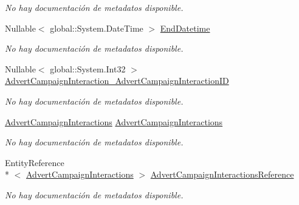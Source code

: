 \begin{DoxyCompactItemize}
\begin{DoxyCompactList}\small\item\em No hay documentación de metadatos disponible. \end{DoxyCompactList}\item 
Nullable$<$ global\-::\-System.\-Date\-Time $>$ \hyperlink{class_game_memory_1_1_advert_campaign_detail_interactions_a9903b1858d25ea52b6a58652e38af39c}{End\-Datetime}
\begin{DoxyCompactList}\small\item\em No hay documentación de metadatos disponible. \end{DoxyCompactList}\item 
Nullable$<$ global\-::\-System.\-Int32 $>$ \hyperlink{class_game_memory_1_1_advert_campaign_detail_interactions_a8eb103b878dc9bd2039eafba9299e467}{Advert\-Campaign\-Interaction\-\_\-\-Advert\-Campaign\-Interaction\-I\-D}
\begin{DoxyCompactList}\small\item\em No hay documentación de metadatos disponible. \end{DoxyCompactList}\item 
\hyperlink{class_game_memory_1_1_advert_campaign_interactions}{Advert\-Campaign\-Interactions} \hyperlink{class_game_memory_1_1_advert_campaign_detail_interactions_aec05f3f3a1cd207dd87a939982dc15e9}{Advert\-Campaign\-Interactions}
\begin{DoxyCompactList}\small\item\em No hay documentación de metadatos disponible. \end{DoxyCompactList}\item 
Entity\-Reference\\*
$<$ \hyperlink{class_game_memory_1_1_advert_campaign_interactions}{Advert\-Campaign\-Interactions} $>$ \hyperlink{class_game_memory_1_1_advert_campaign_detail_interactions_a5d502612f86f888658533cab871f3691}{Advert\-Campaign\-Interactions\-Reference}
\begin{DoxyCompactList}\small\item\em No hay documentación de metadatos disponible. \end{DoxyCompactList}\item 

\end{DoxyCompactItemize}
